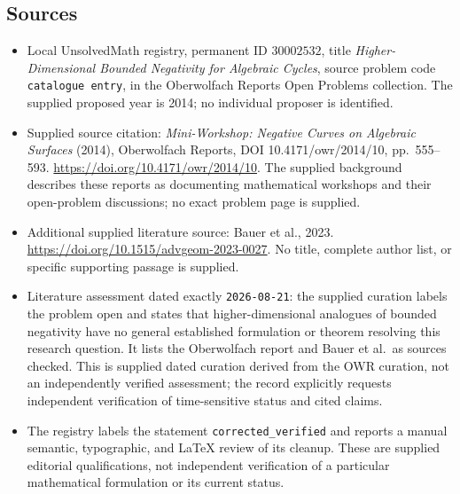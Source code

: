 \documentclass[11pt]{article}
\begin{document}
\subsection{Sources}
\begin{itemize}
\item Local UnsolvedMath registry, permanent ID \(30002532\), title \emph{Higher-Dimensional Bounded Negativity for Algebraic Cycles}, source problem code \texttt{catalogue entry}, in the Oberwolfach Reports Open Problems collection. The supplied proposed year is 2014; no individual proposer is identified.
\item Supplied source citation: \emph{Mini-Workshop: Negative Curves on Algebraic Surfaces} (2014), Oberwolfach Reports, DOI 10.4171/owr/2014/10, pp.\ 555--593. \url{https://doi.org/10.4171/owr/2014/10}. The supplied background describes these reports as documenting mathematical workshops and their open-problem discussions; no exact problem page is supplied.
\item Additional supplied literature source: Bauer et al., 2023. \url{https://doi.org/10.1515/advgeom-2023-0027}. No title, complete author list, or specific supporting passage is supplied.
\item Literature assessment dated exactly \texttt{2026-08-21}: the supplied curation labels the problem open and states that higher-dimensional analogues of bounded negativity have no general established formulation or theorem resolving this research question. It lists the Oberwolfach report and Bauer et al.\ as sources checked. This is supplied dated curation derived from the OWR curation, not an independently verified assessment; the record explicitly requests independent verification of time-sensitive status and cited claims.
\item The registry labels the statement \texttt{corrected\_verified} and reports a manual semantic, typographic, and LaTeX review of its cleanup. These are supplied editorial qualifications, not independent verification of a particular mathematical formulation or its current status.
\end{itemize}
\end{document}
